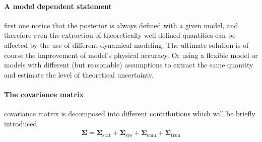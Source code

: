 \paragraph{A model dependent statement} first one notice that the posterior is always defined with a given model, and therefore even the extraction of theoretically well defined quantities can be affected by the use of different dynamical modeling.
The ultimate solution is of course the improvement of model's physical accuracy.
Or using a flexible model or models with different (but reasonable) assumptions to extract the same quantity and estimate the level of theoretical uncertainty.

\paragraph{The covariance matrix} covariance matrix is decomposed into different contributions which will be briefly introduced
\begin{eqnarray}
\mathbf{\Sigma} = \mathbf{\Sigma}_{\textrm{stat}} + \mathbf{\Sigma}_{\textrm{sys}} + \mathbf{\Sigma}_{\textrm{emu}} + \mathbf{\Sigma}_{\textrm{trun}}
\end{eqnarray}

